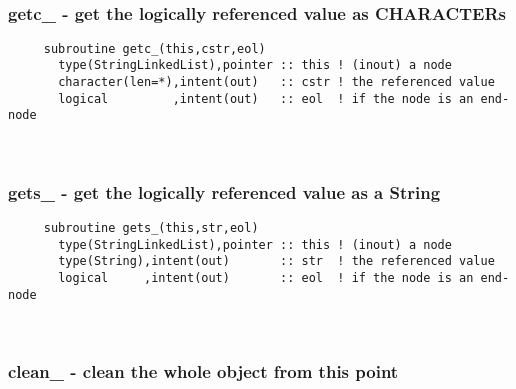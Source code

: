  
\mbox{}\hrulefill\ 
 

  \subsubsection{getc\_ - get the logically referenced value as CHARACTERs}

\begin{verbatim} 
     subroutine getc_(this,cstr,eol)
       type(StringLinkedList),pointer :: this ! (inout) a node
       character(len=*),intent(out)   :: cstr ! the referenced value
       logical         ,intent(out)   :: eol  ! if the node is an end-node
 \end{verbatim}%
 
 
\mbox{}\hrulefill\ 
 

  \subsubsection{gets\_ - get the logically referenced value as a String}

\begin{verbatim} 
     subroutine gets_(this,str,eol)
       type(StringLinkedList),pointer :: this ! (inout) a node
       type(String),intent(out)       :: str  ! the referenced value
       logical     ,intent(out)       :: eol  ! if the node is an end-node
 \end{verbatim}%
 
 
\mbox{}\hrulefill\ 
 

  \subsubsection{clean\_ - clean the whole object from this point}


